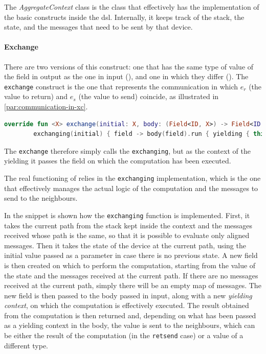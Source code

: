 The \emph{AggregateContext} class is the class that effectively has the implementation of the basic constructs inside the \ac{dsl}.
Internally, it keeps track of the {stack}, the state, and the messages that need to be sent by that device.

\paragraph{Exchange}
There are two versions of this construct: one that has the same type of value of the field in output as the one in input (),
and one in which they differ ().
The \texttt{exchange} construct is the one that represents the communication in which $e_r$ (the value to return)
and $e_s$ (the value to send) coincide, as illustrated in \ref{par:communication-in-xc}.

\begin{lstlisting}[language=kt,label={lst:exchangeImpl},caption={The implementation of the \texttt{exchange} function.}]
override fun <X> exchange(initial: X, body: (Field<ID, X>) -> Field<ID, X>): Field<ID, X> =
        exchanging(initial) { field -> body(field).run { yielding { this } } }
\end{lstlisting}

The \texttt{exchange} therefore simply calls the \texttt{exchanging}, but as the context of the yielding it passes the
field on which the computation has been executed.

The real functioning of \xc{} relies in the \texttt{exchanging} implementation, which is the one that effectively manages
the actual logic of the computation and the messages to send to the neighbours.

In the  snippet is shown how the \texttt{exchanging} function is implemented.
First, it takes the current path from the stack kept inside the context and the messages received whose path is the same,
so that it is possible to evaluate only aligned messages.
Then it takes the state of the device at the current path, using the initial value passed as a parameter in case there is no previous state.
A new field is then created on which to perform the computation, starting from the value of the state and the messages received at the current path.
If there are no messages received at the current path, simply there will be an empty map of messages.
The new field is then passed to the body passed in input, along with a new \emph{yielding context}, on which the computation is effectively executed.
The result obtained from the computation is then returned and, depending on what has been passed as a yielding context in the body,
the value is sent to the neighbours, which can be either the result of the computation (in the \texttt{retsend} case) or a value of a different type.

